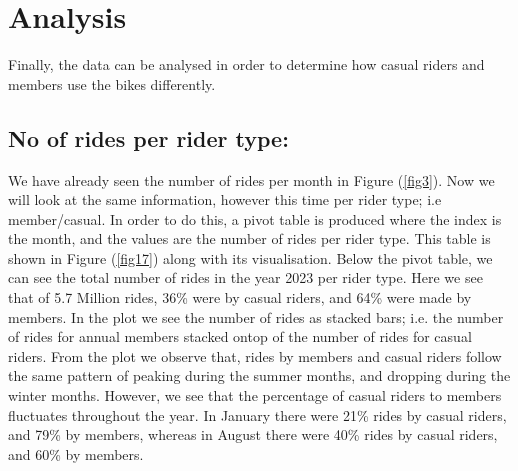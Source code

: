 \documentclass[12pt]{article}
\begin{document}
\section{Analysis}
Finally, the data can be analysed in order to determine how casual riders and members use the bikes differently.

\subsection{No of rides per rider type:}
We have already seen the number of rides per month in Figure (\underline{\ref{fig3}}). Now we will look at the same information, however this time per rider type; i.e member/casual. In order to do this, a pivot table is produced where the index is the month, and the values are the number of rides per rider type. This table is shown in Figure (\underline{\ref{fig17}}) along with its visualisation. Below the pivot table, we can see the total number of rides in the year 2023 per rider type. Here we see that of 5.7 Million rides, 36\% were by casual riders, and 64\% were made by members. In the plot we see the number of rides as stacked bars; i.e. the number of rides for annual members stacked ontop of the number of rides for casual riders.  From the plot we observe that, rides by members and casual riders follow the same pattern of peaking during the summer months, and dropping during the winter months. However, we see that the percentage of casual riders to members fluctuates throughout the year. In January there were 21\% rides by casual riders, and 79\% by members, whereas in August there were 40\% rides by casual riders, and 60\% by members. \\
\newline
\end{document}
